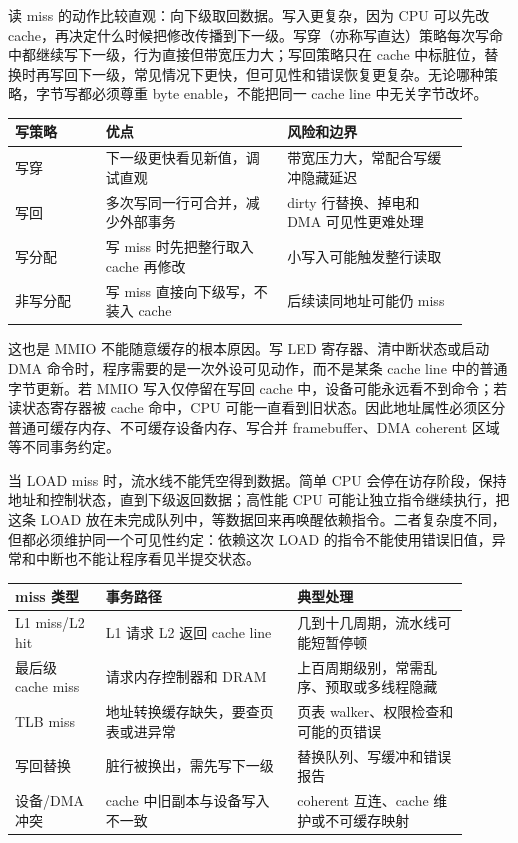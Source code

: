 读 miss 的动作比较直观：向下级取回数据。写入更复杂，因为 CPU 可以先改 cache，再决定什么时候把修改传播到下一级。写穿（亦称写直达）策略每次写命中都继续写下一级，行为直接但带宽压力大；写回策略只在 cache 中标脏位，替换时再写回下一级，常见情况下更快，但可见性和错误恢复更复杂。无论哪种策略，字节写都必须尊重 byte enable，不能把同一 cache line 中无关字节改坏。

\begin{longtable}{L{0.18\linewidth}L{0.36\linewidth}L{0.36\linewidth}}
\toprule
写策略 & 优点 & 风险和边界 \\
\midrule
写穿 & 下一级更快看见新值，调试直观 & 带宽压力大，常配合写缓冲隐藏延迟 \\\tablerowrule
写回 & 多次写同一行可合并，减少外部事务 & dirty 行替换、掉电和 DMA 可见性更难处理 \\\tablerowrule
写分配 & 写 miss 时先把整行取入 cache 再修改 & 小写入可能触发整行读取 \\\tablerowrule
非写分配 & 写 miss 直接向下级写，不装入 cache & 后续读同地址可能仍 miss \\
\bottomrule
\end{longtable}

这也是 MMIO 不能随意缓存的根本原因。写 LED 寄存器、清中断状态或启动 DMA 命令时，程序需要的是一次外设可见动作，而不是某条 cache line 中的普通字节更新。若 MMIO 写入仅停留在写回 cache 中，设备可能永远看不到命令；若读状态寄存器被 cache 命中，CPU 可能一直看到旧状态。因此地址属性必须区分普通可缓存内存、不可缓存设备内存、写合并 framebuffer、DMA coherent 区域等不同事务约定。

当 LOAD miss 时，流水线不能凭空得到数据。简单 CPU 会停在访存阶段，保持地址和控制状态，直到下级返回数据；高性能 CPU 可能让独立指令继续执行，把这条 LOAD 放在未完成队列中，等数据回来再唤醒依赖指令。二者复杂度不同，但都必须维护同一个可见性约定：依赖这次 LOAD 的指令不能使用错误旧值，异常和中断也不能让程序看见半提交状态。

\begin{longtable}{L{0.18\linewidth}L{0.38\linewidth}L{0.34\linewidth}}
\toprule
miss 类型 & 事务路径 & 典型处理 \\
\midrule
L1 miss/L2 hit & L1 请求 L2 返回 cache line & 几到十几周期，流水线可能短暂停顿 \\\tablerowrule
最后级 cache miss & 请求内存控制器和 DRAM & 上百周期级别，常需乱序、预取或多线程隐藏 \\\tablerowrule
TLB miss & 地址转换缓存缺失，要查页表或进异常 & 页表 walker、权限检查和可能的页错误 \\\tablerowrule
写回替换 & 脏行被换出，需先写下一级 & 替换队列、写缓冲和错误报告 \\\tablerowrule
设备/DMA 冲突 & cache 中旧副本与设备写入不一致 & coherent 互连、cache 维护或不可缓存映射 \\
\bottomrule
\end{longtable}

